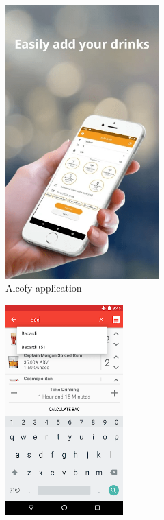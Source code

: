 \begin{figure}[H]
  \begin{subfigure}{0.3\textwidth}
      \centering
      \includegraphics[width=0.65\textwidth]{./img/alcofy.png}
      \caption{Alcofy \cite{Alcofy} application}
      \label{Alcofy}
  \end{subfigure}\hfill
  \begin{subfigure}{0.38\textwidth}
      \centering
      \includegraphics[width=0.5\textwidth]{./img/alcoholcalculator.png}

\end{subfigure}
\end{figure}
